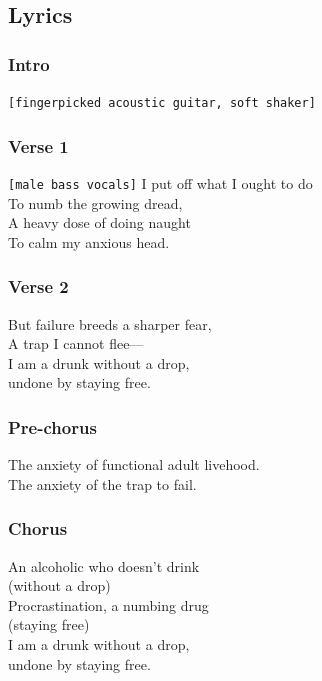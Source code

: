 \documentclass[]{article}
\begin{document}
\subsection{Lyrics}\label{lyrics-11}

\subsubsection{Intro}\label{intro-3}

\texttt{{[}fingerpicked\ acoustic\ guitar,\ soft\ shaker{]}}

\subsubsection{Verse 1}\label{verse-1-6}

\texttt{{[}male\ bass\ vocals{]}} I put off what I ought to do\\
To numb the growing dread,\\
A heavy dose of doing naught\\
To calm my anxious head.

\subsubsection{Verse 2}\label{verse-2-3}

But failure breeds a sharper fear,\\
A trap I cannot flee---\\
I am a drunk without a drop,\\
undone by staying free.

\subsubsection{Pre-chorus}\label{pre-chorus-4}

The anxiety of functional adult livehood.\\
The anxiety of the trap to fail.

\subsubsection{Chorus}\label{chorus-11}

An alcoholic who doesn't drink\\
(without a drop)\\
Procrastination, a numbing drug\\
(staying free)\\
I am a drunk without a drop,\\
undone by staying free.
\end{document}
